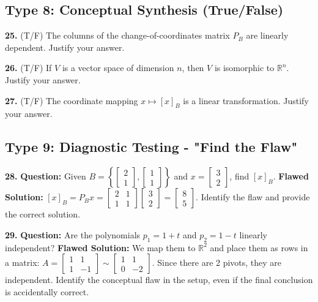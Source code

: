 \documentclass{article}
\begin{document}
\subsection*{Type 8: Conceptual Synthesis (True/False)}
\textbf{25.} (T/F) The columns of the change-of-coordinates matrix $P_B$ are linearly dependent. Justify your answer.

\vspace{0.2cm}
\textbf{26.} (T/F) If $V$ is a vector space of dimension $n$, then $V$ is isomorphic to $\mathbb{R}^n$. Justify your answer.

\vspace{0.2cm}
\textbf{27.} (T/F) The coordinate mapping $x \mapsto [x]_B$ is a linear transformation. Justify your answer.

\subsection*{Type 9: Diagnostic Testing - "Find the Flaw"}
\textbf{28.} \textbf{Question:} Given $B = \left\{ \begin{bmatrix} 2 \\ 1 \end{bmatrix}, \begin{bmatrix} 1 \\ 1 \end{bmatrix} \right\}$ and $x = \begin{bmatrix} 3 \\ 2 \end{bmatrix}$, find $[x]_B$. 
\newline \textbf{Flawed Solution:} $[x]_B = P_B x = \begin{bmatrix} 2 & 1 \\ 1 & 1 \end{bmatrix} \begin{bmatrix} 3 \\ 2 \end{bmatrix} = \begin{bmatrix} 8 \\ 5 \end{bmatrix}$.
\newline Identify the flaw and provide the correct solution.

\vspace{0.2cm}
\textbf{29.} \textbf{Question:} Are the polynomials $p_1 = 1+t$ and $p_2 = 1-t$ linearly independent?
\newline \textbf{Flawed Solution:} We map them to $\mathbb{R}^2$ and place them as rows in a matrix: $A = \begin{bmatrix} 1 & 1 \\ 1 & -1 \end{bmatrix} \sim \begin{bmatrix} 1 & 1 \\ 0 & -2 \end{bmatrix}$. Since there are 2 pivots, they are independent.
\newline Identify the conceptual flaw in the setup, even if the final conclusion is accidentally correct.
\end{document}
